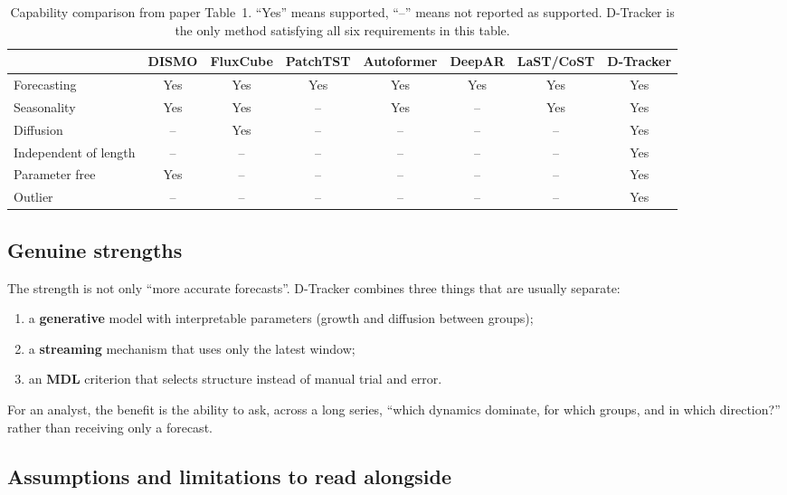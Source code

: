 \begin{table}[htbp]
  \centering
  \scriptsize
  \caption{Capability comparison from paper Table~1. ``Yes'' means supported, ``--'' means not reported as
  supported. D-Tracker is the only method satisfying all six requirements in this table.}
  \label{tab:capabilities}
  \begin{tabular}{@{}lccccccc@{}}
    \toprule
    & DISMO & FluxCube & PatchTST & Autoformer & DeepAR & LaST/CoST & D-Tracker \\
    \midrule
    Forecasting & Yes & Yes & Yes & Yes & Yes & Yes & Yes \\
    Seasonality & Yes & Yes & -- & Yes & -- & Yes & Yes \\
    Diffusion & -- & Yes & -- & -- & -- & -- & Yes \\
    Independent of length & -- & -- & -- & -- & -- & -- & Yes \\
    Parameter free & Yes & -- & -- & -- & -- & -- & Yes \\
    Outlier & -- & -- & -- & -- & -- & -- & Yes \\
    \bottomrule
  \end{tabular}
\end{table}

\subsection{Genuine strengths}

The strength is not only ``more accurate forecasts''. D-Tracker combines three things that are usually
separate:
\begin{enumerate}
  \item a \textbf{generative} model with interpretable parameters (growth and diffusion between groups);
  \item a \textbf{streaming} mechanism that uses only the latest window;
  \item an \textbf{MDL} criterion that selects structure instead of manual trial and error.
\end{enumerate}
For an analyst, the benefit is the ability to ask, across a long series, ``which dynamics dominate,
for which groups, and in which direction?'' rather than receiving only a forecast.

\subsection{Assumptions and limitations to read alongside}

